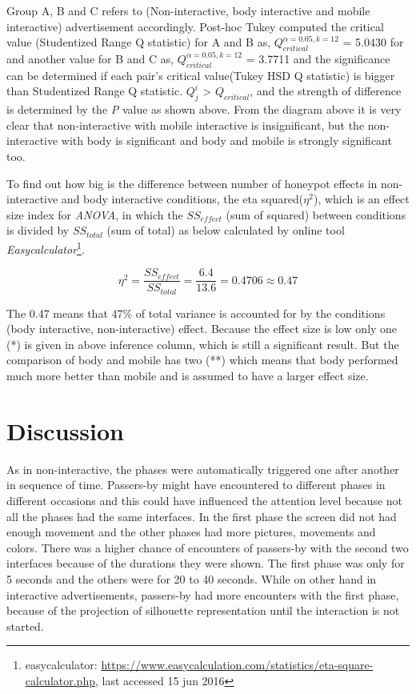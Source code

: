 Group A, B and C refers to (Non-interactive, body interactive and mobile interactive) advertisement accordingly. Post-hoc Tukey computed the critical value (Studentized Range Q statistic) for A and B as, ${Q}_{critical}^{\alpha=0.05,k=12}$ = 5.0430 for and another  value for B and C as, ${Q}_{critical}^{\alpha=0.05,k=12}$ = 3.7711 and the significance can be determined if each pair’s critical value(Tukey HSD Q statistic) is bigger than Studentized Range Q statistic. ${Q}_{j}^{i }$ > ${Q}_{critical}$, and the strength of difference is determined by the \emph{P} value as shown above. From the diagram above it is very clear that non-interactive with mobile interactive is insignificant, but the non-interactive with body is significant and body and mobile is strongly significant too.

To find out how big is the difference between number of honeypot effects in non-interactive and body interactive conditions, the eta squared(${\eta}^2$), which is an effect size index for \emph{ANOVA}, in which the $SS_{effect}$ (sum of squared) between conditions is divided by $SS_{total}$  (sum of total) as below calculated by online tool \emph{Easycalculator}\footnote{easycalculator: \url{https://www.easycalculation.com/statistics/eta-square-calculator.php}, last accessed 15 jun 2016}.

\[
{\eta}^2 = \frac{{SS}_{effect}}{{SS}_{total}} = \frac{6.4}{13.6} = 0.4706 \approx 0.47
\]

The 0.47 means that 47\% of total variance is accounted for by the conditions (body interactive, non-interactive) effect. Because the effect size is low only one (*) is given in above inference column, which is still a significant result. But the comparison of body and mobile has two (**) which means that body performed much more better than mobile and is assumed to have a larger effect size.


\section{Discussion}

As in non-interactive, the phases were automatically triggered one after another in sequence of time. Passers-by might have encountered to different phases in different occasions and this could have influenced the attention level because not all the phases had the same interfaces. In the first phase the screen did not had enough movement and the other phases had more pictures, movements and colors. There was a higher chance of encounters of passers-by with the second two interfaces because of the durations they were shown. The first phase was only for 5 seconds and the others were for 20 to 40 seconds. While on other hand in interactive advertisements, passers-by had more encounters with the first phase, because of the projection of silhouette representation until the interaction is not started. 

